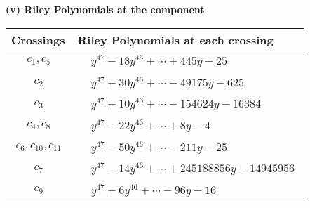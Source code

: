 \documentclass[1p]{elsarticle_modified}
\theoremstyle{definition}
\begin{document}
\flushleft \textbf{(v) Riley Polynomials at the component}\newline \\
\begin{tabular}{m{50pt}|m{274pt}}
Crossings & \hspace{64pt}Riley Polynomials at each crossing \\
\hline $$\begin{aligned}c_{1},c_{5}\end{aligned}$$&$\begin{aligned}
&y^{47}-18 y^{46}+\cdots+445 y-25
\end{aligned}$\\
\hline $$\begin{aligned}c_{2}\end{aligned}$$&$\begin{aligned}
&y^{47}+30 y^{46}+\cdots-49175 y-625
\end{aligned}$\\
\hline $$\begin{aligned}c_{3}\end{aligned}$$&$\begin{aligned}
&y^{47}+10 y^{46}+\cdots-154624 y-16384
\end{aligned}$\\
\hline $$\begin{aligned}c_{4},c_{8}\end{aligned}$$&$\begin{aligned}
&y^{47}-22 y^{46}+\cdots+8 y-4
\end{aligned}$\\
\hline $$\begin{aligned}c_{6},c_{10},c_{11}\end{aligned}$$&$\begin{aligned}
&y^{47}-50 y^{46}+\cdots-211 y-25
\end{aligned}$\\
\hline $$\begin{aligned}c_{7}\end{aligned}$$&$\begin{aligned}
&y^{47}-14 y^{46}+\cdots+245188856 y-14945956
\end{aligned}$\\
\hline $$\begin{aligned}c_{9}\end{aligned}$$&$\begin{aligned}
&y^{47}+6 y^{46}+\cdots-96 y-16
\end{aligned}$\\
\hline
\end{tabular}\\~\\
\end{document}
